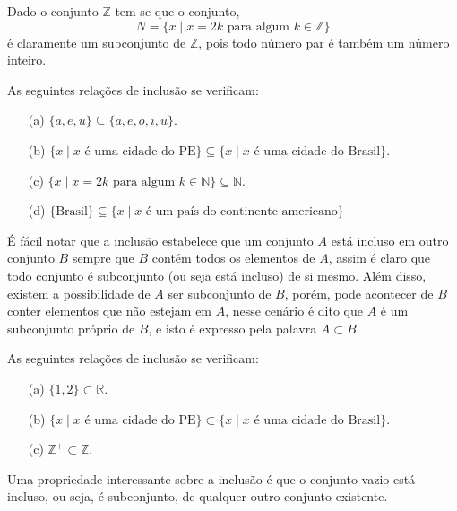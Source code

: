 \begin{exemplo}\label{exe:InclusaoConjuntos1}
  Dado o conjunto $\mathbb{Z}$ tem-se que o conjunto,  
  $$N = \{x \mid x = 2k \mbox{ para algum } k \in \mathbb{Z}\}$$ 
  é claramente um subconjunto de $\mathbb{Z}$, pois todo número par é também um número inteiro.
\end{exemplo}

\begin{exemplo}\label{exe:InclusaoConjuntos2}
  As seguintes relações de inclusão se verificam:
	\begin{itemize}
		\item[(a)] $\{a, e, u\} \subseteq \{a, e, o, i , u\}$.
		\item[(b)] $\{x \mid x \mbox{ é uma cidade do PE}\} \subseteq \{x \mid x \mbox{ é uma cidade do Brasil}\}$.
		\item[(c)] $\{x \mid x = 2k \mbox{ para algum } k \in \mathbb{N}\} \subseteq \mathbb{N}$.
		\item[(d)] $\{\mbox{Brasil}\} \subseteq \{x \mid x \mbox{ é um país do continente americano}\}$
	\end{itemize}
\end{exemplo}

É fácil notar que a inclusão estabelece que um conjunto $A$ está incluso em outro conjunto $B$ sempre que $B$ contém todos os elementos de $A$, assim é claro que todo conjunto é subconjunto (ou seja está incluso) de si mesmo. Além disso, existem a possibilidade de $A$ ser subconjunto de $B$, porém, pode acontecer de $B$ conter elementos que não estejam em $A$, nesse cenário é dito que $A$ é um subconjunto próprio de $B$, e isto é expresso pela palavra $A \subset B$. 

\begin{exemplo}\label{exe:InclusaoPropria1}
	As seguintes relações de inclusão se verificam:
	\begin{itemize}
		\item[(a)] $\{1, 2\} \subset \mathbb{R}$.
		\item[(b)] $\{x \mid x \mbox{ é uma cidade do PE}\} \subset \{x \mid x \mbox{ é uma cidade do Brasil}\}$.
		\item[(c)] $\mathbb{Z}^+ \subset \mathbb{Z}$.
	\end{itemize}
\end{exemplo}

Uma propriedade interessante sobre a inclusão é que o conjunto vazio está incluso, ou seja, é subconjunto, de qualquer outro conjunto existente.

